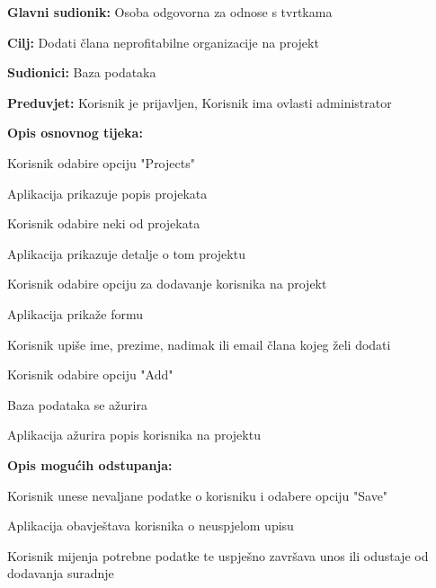 						\noindent {}
					\begin{packed_item}

						\item \textbf{Glavni sudionik:} Osoba odgovorna za odnose s tvrtkama
						\item \textbf{Cilj:} Dodati člana neprofitabilne organizacije na projekt
						\item \textbf{Sudionici:} Baza podataka
						\item \textbf{Preduvjet:} Korisnik je prijavljen, Korisnik ima ovlasti administrator
						\item \textbf{Opis osnovnog tijeka:}
					
						\item[] \begin{packed_enum}
					
							\item Korisnik odabire opciju "Projects"
							\item Aplikacija prikazuje popis projekata
							\item Korisnik odabire neki od projekata
							\item Aplikacija prikazuje detalje o tom projektu
							\item Korisnik odabire opciju za dodavanje korisnika na projekt
							\item Aplikacija prikaže formu
							\item Korisnik upiše ime, prezime, nadimak ili email člana kojeg želi dodati
							\item Korisnik odabire opciju "Add"
							\item Baza podataka se ažurira
							\item Aplikacija ažurira popis korisnika na projektu
						\end{packed_enum}
					
						\item \textbf{Opis mogućih odstupanja:}
					
						\item[] \begin{packed_item}
                        
                        	\item[7.b] Korisnik unese nevaljane podatke o korisniku i odabere opciju "Save"
							\item[] \begin{packed_enum}

								\item Aplikacija obavještava korisnika o neuspjelom upisu
								\item Korisnik mijenja potrebne podatke te uspješno završava unos ili
								odustaje od dodavanja suradnje

							\end{packed_enum}
					
						\end{packed_item}
					\end{packed_item}

